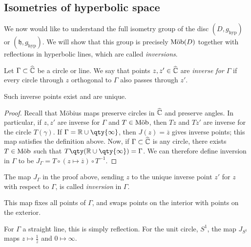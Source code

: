 \subsection{Isometries of hyperbolic space}
We now would like to understand the full isometry group of the disc $(D, g_{\text{hyp}})$ or $(\mathfrak{h}, g_{\text{hyp}})$.
We will show that this group is precisely $\text{M\"ob}(D)$ together with reflections in hyperbolic lines, which are called \textit{inversions}.
\begin{definition}
	Let $\Gamma \subset \widehat{\mathbb C}$ be a circle or line.
	We say that points $z, z' \in \widehat{\mathbb C}$ are \textit{inverse for $\Gamma$} if every circle through $z$ orthogonal to $\Gamma$ also passes through $z'$.
\end{definition}
\begin{lemma}
	Such inverse points exist and are unique.
\end{lemma}
\begin{proof}
	Recall that M\"obius maps preserve circles in $\widehat{\mathbb C}$ and preserve angles.
	In particular, if $z, z'$ are inverse for $\Gamma$ and $T \in \text{M\"ob}$, then $Tz$ and $Tz'$ are inverse for the circle $T(\gamma)$.
	If $\Gamma = \mathbb R \cup \qty{\infty}$, then $J(z) = \overline z$ gives inverse points; this map satisfies the definition above.
	Now, if $\Gamma \subset \widehat{\mathbb C}$ is any circle, there exists $T \in \text{M\"ob}$ such that $T \qty(\mathbb R \cup \qty{\infty}) = \Gamma$.
	We can therefore define inversion in $\Gamma$ to be $J_\Gamma = T \circ (z \mapsto \overline z) \circ T^{-1}$.
\end{proof}
\begin{definition}
	The map $J_\Gamma$ in the proof above, sending $z$ to the unique inverse point $z'$ for $z$ with respect to $\Gamma$, is called \textit{inversion} in $\Gamma$.
\end{definition}
This map fixes all points of $\Gamma$, and swaps points on the interior with points on the exterior.
\begin{example}
	For $\Gamma$ a straight line, this is simply reflection.
	For the unit circle, $S^1$, the map $J_{S^1}$ maps $z \mapsto \frac{1}{\overline z}$ and $0 \mapsto \infty$.
\end{example}
